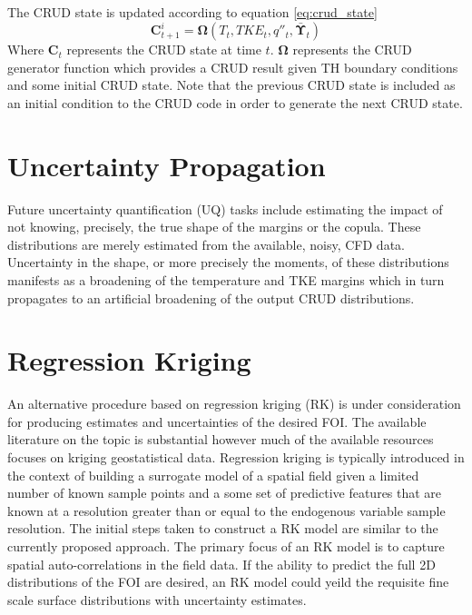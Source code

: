 The CRUD state is updated according to equation \ref{eq:crud_state}
\begin{equation}
\mathrm{\mathbf{C}}^i_{t+1} = \mathbf{\Omega}(T_t, TKE_t, q''_t, \mathbf{\bar \Upsilon}_t)
\label{eq:crud_state}
\end{equation}
Where $\mathbf{C}_t$ represents the CRUD state at time $t$.  $\mathbf{\Omega}$ represents the CRUD generator function which provides a CRUD result given TH boundary conditions and some initial CRUD state.   Note that the previous CRUD state is included as an initial condition to the CRUD code in order to generate the next CRUD state.


\section{Uncertainty Propagation}

Future uncertainty quantification (UQ) tasks include estimating the impact of not knowing, precisely, the true shape of the margins or the copula.  These distributions are merely estimated from the available, noisy, CFD data.  Uncertainty in the shape, or more precisely the moments, of these distributions manifests as a broadening of the temperature and TKE margins which in turn propagates to an artificial broadening of the output CRUD distributions.

\section{Regression Kriging}

An alternative procedure based on regression kriging (RK) is under consideration for producing estimates and uncertainties of the desired FOI.
The available literature on the topic is substantial however much of the available resources focuses on kriging geostatistical data.  Regression kriging is typically introduced in the context of building
a surrogate model of a spatial field given a limited number of known sample points and a some set of predictive features that are known at a resolution greater than or equal to the endogenous variable sample resolution.
The initial steps taken to construct a RK model are similar to the currently proposed approach.  The primary focus of an RK model is to capture spatial auto-correlations in the field data.   If the ability to predict the full 2D distributions of the FOI are desired, an RK model could yeild the requisite fine scale surface distributions with uncertainty estimates. \\

